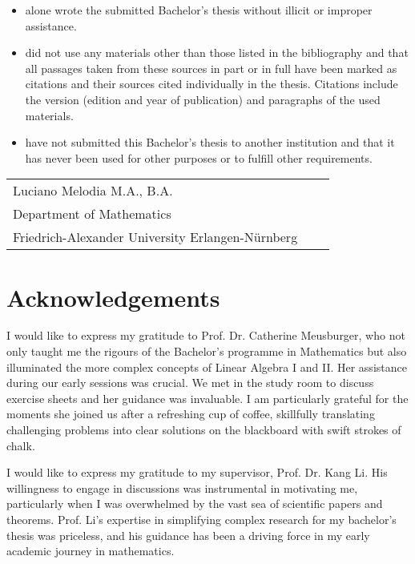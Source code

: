 \documentclass[12pt]{report}
\numberwithin{conj}{section}
\begin{document}
\begin{itemize}
	\item alone wrote the submitted Bachelor's thesis without illicit or improper
	      assistance.
	      	      
	\item did not use any materials other than those listed in the bibliography and
	      that all passages taken from these sources in part or in full have been marked
	      as citations and their sources cited individually in the thesis. Citations
	      include the version (edition and year of publication) and paragraphs of the used materials.
	      	      
	\item have not submitted this Bachelor's thesis to another institution and that
	      it has never been used for other purposes or to fulfill other requirements.
\end{itemize}

\vspace{2cm}
\begin{tabular}{@{}p{5in}p{2in}p{2in}@{}}
	\hrulefill\newline
	Luciano Melodia M.A., B.A. \\
	Department of Mathematics \\
	Friedrich-Alexander University Erlangen-Nürnberg
\end{tabular}

\chapter*{Acknowledgements}
I would like to express my gratitude to Prof. Dr. Catherine Meusburger, who not only taught me the rigours of the Bachelor's programme in Mathematics but also illuminated the more complex concepts of Linear Algebra I and II. Her assistance during our early sessions was crucial. We met in the study room to discuss exercise sheets and her guidance was invaluable. I am particularly grateful for the moments she joined us after a refreshing cup of coffee, skillfully translating challenging problems into clear solutions on the blackboard with swift strokes of chalk.

I would like to express my gratitude to my supervisor, Prof. Dr. Kang Li. His willingness to engage in discussions was instrumental in motivating me, particularly when I was overwhelmed by the vast sea of scientific papers and theorems. Prof. Li's expertise in simplifying complex research for my bachelor's thesis was priceless, and his guidance has been a driving force in my early academic journey in mathematics.
\end{document}
